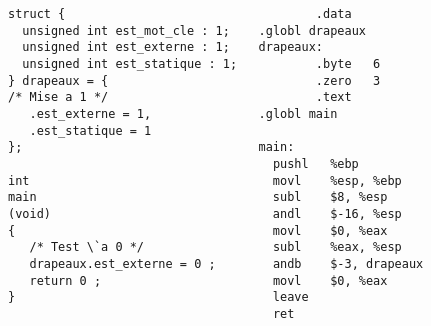 \begin{frame}[fragile]
\begin{verbatim}
struct {                                   .data                         
  unsigned int est_mot_cle : 1;    .globl drapeaux 
  unsigned int est_externe : 1;    drapeaux:                             
  unsigned int est_statique : 1;           .byte   6                     
} drapeaux = {                             .zero   3                     
/* Mise a 1 */                             .text                         
   .est_externe = 1,               .globl main                           
   .est_statique = 1                                                     
};                                 main:                                 
                                     pushl   %ebp                    
int                                  movl    %esp, %ebp            
main                                 subl    $8, %esp              
(void)                               andl    $-16, %esp            
{                                    movl    $0, %eax              
   /* Test \`a 0 */                  subl    %eax, %esp            
   drapeaux.est_externe = 0 ;        andb    $-3, drapeaux         
   return 0 ;                        movl    $0, %eax              
}                                    leave                         
                                     ret                           
\end{verbatim}
\end{frame}
